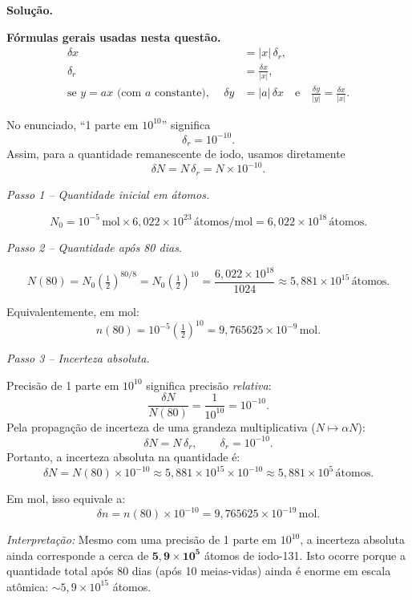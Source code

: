 \documentclass[12pt,a4paper]{article}
\theoremstyle{definition}
\newenvironment{solucao}{%
  \par\medskip\noindent\textbf{Solu\c{c}\~ao.}\quad\ignorespaces
}{%
  \par\medskip
}
\begin{document}
\begin{solucao}
\noindent\textbf{F\'ormulas gerais usadas nesta quest\~ao.}
\begin{align}
  \delta x &= |x|\,\delta_r, \\
  \delta_r &= \frac{\delta x}{|x|}, \\
  \text{se } y = a x \text{ (com } a \text{ constante), }\quad \delta y &= |a|\,\delta x \quad\text{e}\quad \frac{\delta y}{|y|} = \frac{\delta x}{|x|}.
\end{align}

\noindent No enunciado, ``1 parte em $10^{10}$'' significa
\[
\delta_r = 10^{-10}.
\]
Assim, para a quantidade remanescente de iodo, usamos diretamente
\[
\delta N = N\,\delta_r = N\times 10^{-10}.
\]

\medskip
\noindent\textit{Passo 1 -- Quantidade inicial em \'atomos.}

\[
  N_0 = 10^{-5}\,\text{mol} \times 6{,}022\times 10^{23}\,\text{\'atomos/mol} = 6{,}022\times 10^{18}\,\text{\'atomos}.
\]

\noindent\textit{Passo 2 -- Quantidade ap\'os 80 dias.}

\[
  N(80) = N_0\!\left(\tfrac{1}{2}\right)^{80/8} = N_0\!\left(\tfrac{1}{2}\right)^{10} = \frac{6{,}022\times 10^{18}}{1024} \approx 5{,}881\times 10^{15}\,\text{\'atomos}.
\]

Equivalentemente, em mol:
\[
n(80)=10^{-5}\left(\tfrac{1}{2}\right)^{10}=9{,}765625\times 10^{-9}\,\text{mol}.
\]

\noindent\textit{Passo 3 -- Incerteza absoluta.}

Precis\~ao de 1 parte em $10^{10}$ significa precis\~ao \textit{relativa}:
\[
  \frac{\delta N}{N(80)} = \frac{1}{10^{10}} = 10^{-10}.
\]
Pela propaga\c{c}\~ao de incerteza de uma grandeza multiplicativa ($N\mapsto \alpha N$):
\[
\delta N = N\,\delta_r,\qquad \delta_r=10^{-10}.
\]
Portanto, a incerteza absoluta na quantidade \'e:
\begin{equation}
  \boxed{\delta N = N(80)\times 10^{-10} \approx 5{,}881\times 10^{15} \times 10^{-10} \approx 5{,}881\times 10^{5}\,\text{\'atomos}.}
\end{equation}

Em mol, isso equivale a:
\[
\delta n = n(80)\times 10^{-10} = 9{,}765625\times 10^{-19}\,\text{mol}.
\]

\noindent\textit{Interpreta\c{c}\~ao:} Mesmo com uma precis\~ao de 1 parte em $10^{10}$, a incerteza absoluta ainda corresponde a cerca de $\mathbf{5{,}9\times 10^5}$ \'atomos de iodo-131. Isto ocorre porque a quantidade total ap\'os 80 dias (ap\'os 10 meias-vidas) ainda \'e enorme em escala at\^omica: $\sim 5{,}9\times 10^{15}$ \'atomos.


\end{solucao}
\end{document}
